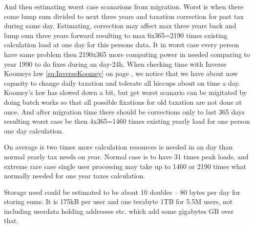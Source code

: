 And then estimating worst case scanarions from migration. Worst is when there
come lump sum divided to next three years and taxation correction for past tax
during same day. Estimating, correction may affect max three years back and
lump sum three years forward resulting to max 6x365=2190 times existing
calculation load at one day for this persons data. It in worst case every
person have same problem then 2190x365 more computing power in needed
comparing to year 1990 to do fixes during an day-24h. When checking time with
Inverse Koomeys law \ref{eq:InverseKoomey} on page \pageref{eq:InverseKoomey},
we notice that we have about now capasity to change daily taxation and tolerate
all hiccups about on time a day. Koomey's law has slowed down a bit, but get
worst scanario can be migitated by doing batch works so that all possible
fixations for old taxation are not done at once. And after migration time there
should be corrections only to last 365 days resulting worst case be then
4x365=1460 times existing yearly load for one person one day calculation.

On average is two times more calculation resources is needed in an day than
normal yearly tax needs on year. Normal case is to have 31 times peak loads,
and extreme rare case single user processing may take up to 1460 or 2190 times
what normally needed for one year taxes calculation.

Storage need could be estimated to be about 10 doubles -- 80 bytes per day for
storing sums. It is 175kB per user and one terabyte 1TB for 5.5M users, not
including userdata holding addresses etc. which add some gigabytes GB over
that.

